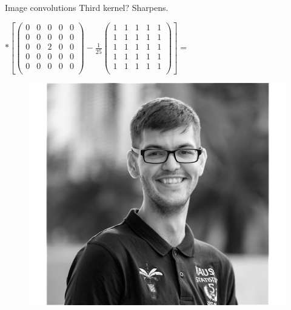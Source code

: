 \documentclass{beamer}
\begin{document}
\begin{frame}{Image convolutions}
Third kernel? Sharpens.

\begin{minipage}{0.65\linewidth}
$ * \left[\begin{pmatrix}
0 & 0 & 0 & 0 &0 \\
0 & 0 & 0 & 0 &0 \\
0 & 0 & 2 & 0 &0 \\
0 & 0 & 0 & 0 &0 \\
0 & 0 & 0 & 0 &0 \\
\end{pmatrix}-\frac{1}{25}\begin{pmatrix}
1 & 1 & 1 & 1 &1 \\
1 & 1 & 1 & 1 &1 \\
1 & 1 & 1 & 1 &1 \\
1 & 1 & 1 & 1 &1 \\
1 & 1 & 1 & 1 &1 \\
\end{pmatrix}\right] =$
\end{minipage}
\begin{minipage}{0.32\linewidth}
\begin{figure}
\includegraphics[width=\linewidth]{Images/conv5.png}
\end{figure}
\end{minipage}
\end{frame}
\end{document}
